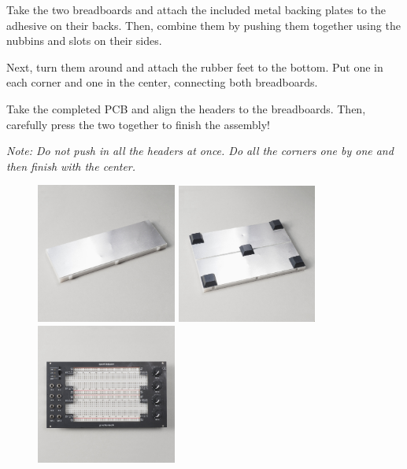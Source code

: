 \documentclass[12pt, a4paper]{article}
\begin{document}
Take the two breadboards and attach the included metal backing plates to the adhesive on their
backs. Then, combine them by pushing them together using the nubbins and slots on their sides.

Next, turn them around and attach the rubber feet to the bottom. Put one in each corner and one
in the center, connecting both breadboards.

Take the completed PCB and align the headers to the breadboards. Then, carefully press the two
together to finish the assembly!

\textit{%
    Note: Do not push in all the headers at once. Do all the corners one by one and then finish
    with the center.
}

\begin{figure}[H]
    \centering
    \includegraphics[width=46mm]{images/40_03_metal_plate.jpg}
    \hspace{2mm}
    \includegraphics[width=46mm]{images/40_04_rubberfeet.jpg}
    \hspace{2mm}
    \includegraphics[width=46mm]{images/40_05_fully_assembled.jpg}
\end{figure}
\end{document}
